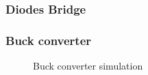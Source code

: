 
\frame
{
\frametitle{Diodes Bridge}

\begin{figure}[h]
\centerline{
 \scalebox{0.3}{
    
 }
}\end{figure}
\begin {figure}[h]
 \scalebox{0.5}{

}
\end {figure} 

}
\frame
{
\frametitle{Buck converter}

\begin{figure}[h]
\centerline{
 \scalebox{0.5}{
    
 }
}\end{figure}
\begin {figure}[h]
 \scalebox{0.5}{

}
\caption{Buck converter simulation}
\end {figure} 

}